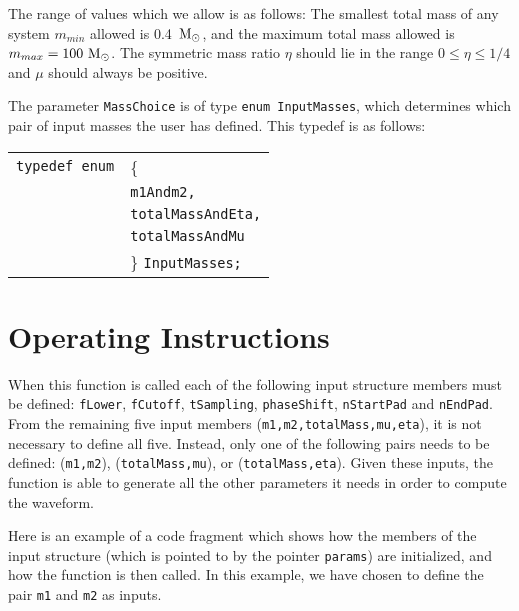 \documentclass[12pt]{article}
\begin{document}
The range of values which we allow is as follows: The smallest total mass of any system $m_{min}$ allowed is 0.4~$\rm{M_{\odot}}$, and the maximum total mass allowed is $m_{max}=100~\rm{M_{\odot}}$. The symmetric mass ratio $\eta$ should lie in the range $0 \leq \eta \leq 1/4$ and $\mu$ should always be positive.

The parameter \texttt{MassChoice} is of type \texttt{enum InputMasses}, which determines which pair of input masses the user has defined. This typedef is as follows:

\vspace{5mm}

\begin{tabular}{ll}
\texttt{typedef enum} & \{ \\
                      & \texttt{m1Andm2,} \\
                      & \texttt{totalMassAndEta,}  \\
                      & \texttt{totalMassAndMu} \\
                      & \} \texttt{InputMasses;}
\end{tabular}

\vspace{5mm}
 


\section{Operating Instructions}

When this function is called each of the following input structure members must be defined:
\texttt{fLower}, \texttt{fCutoff}, \texttt{tSampling}, \texttt{phaseShift}, \texttt{nStartPad} and \texttt{nEndPad}. From the remaining five input members (\texttt{m1,m2,totalMass,mu,eta}), it is not necessary to define all five. Instead, only  one of the following pairs needs to be defined: (\texttt{m1,m2}), (\texttt{totalMass,mu}), or (\texttt{totalMass,eta}). Given these inputs, the function is able to generate all the other parameters it needs in order to compute the waveform.

Here is an example of a code fragment which shows how the members of the input structure (which is pointed to by the pointer \texttt{params}) are initialized, and how the function is then called. In this example, we have chosen to define the pair \texttt{m1} and \texttt{m2} as inputs.

\vspace{5mm}
\end{document}
